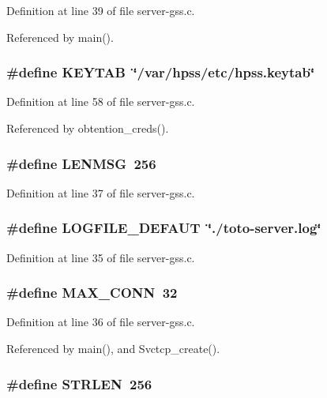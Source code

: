 Definition at line 39 of file server-gss.c.

Referenced by main().
\subsubsection{\setlength{\rightskip}{0pt plus 5cm}\#define KEYTAB\ \char`\"{}/var/hpss/etc/hpss.keytab\char`\"{}}\label{server-gss_8c_a22}




Definition at line 58 of file server-gss.c.

Referenced by obtention\_\-creds().
\subsubsection{\setlength{\rightskip}{0pt plus 5cm}\#define LENMSG\ 256}\label{server-gss_8c_a3}




Definition at line 37 of file server-gss.c.
\subsubsection{\setlength{\rightskip}{0pt plus 5cm}\#define LOGFILE\_\-DEFAUT\ \char`\"{}./toto-{\bf server}.log\char`\"{}}\label{server-gss_8c_a1}




Definition at line 35 of file server-gss.c.
\subsubsection{\setlength{\rightskip}{0pt plus 5cm}\#define MAX\_\-CONN\ 32}\label{server-gss_8c_a2}




Definition at line 36 of file server-gss.c.

Referenced by main(), and Svctcp\_\-create().
\subsubsection{\setlength{\rightskip}{0pt plus 5cm}\#define STRLEN\ 256}\label{server-gss_8c_a4}




